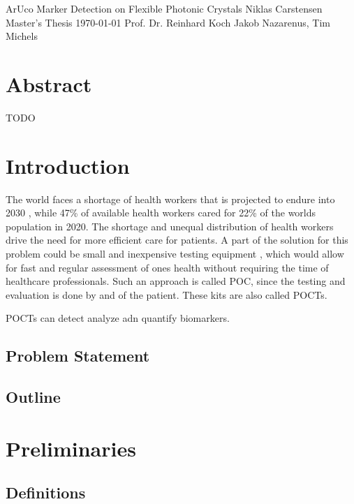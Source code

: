 \documentclass[10pt]{book}
\newcommand*\NewPage{\newpage\null\thispagestyle{empty}\newpage}
\begin{document}
\frontmatter

\studtitlepage%
{ArUco Marker Detection on Flexible Photonic Crystals}%
{}
{Niklas Carstensen}%
{Master's Thesis}%
{\today}%
{Prof. Dr. Reinhard Koch}%
{Jakob Nazarenus, Tim Michels}%
\NewPage{}
\setcounter{page}{2}
\studeidesstatt
\NewPage{}

\setcounter{page}{3}
\chapter*{Abstract}
TODO

\tableofcontents
\listoffigures
\mainmatter
\chapter{Introduction}

The world faces a shortage of health workers that is projected to endure into 2030 \cite{BMJHealthWorkforce22}, while 47\% of available health workers cared for 22\% of the worlds population in 2020. The shortage and unequal distribution of health workers drive the need for more efficient care for patients. A part of the solution for this problem could be small and inexpensive testing equipment \cite{Fab23}, which would allow for fast and regular assessment of ones health without requiring the time of healthcare professionals. Such an approach is called \ac{POC}, since the testing and evaluation is done by and of the patient. These kits are also called \acp{POCT}. 

\acp{POCT} can detect analyze adn quantify biomarkers. 

\section{Problem Statement}

\section{Outline}

\chapter{Preliminaries}
\label{chap:prelim}

\section{Definitions}
\end{document}
